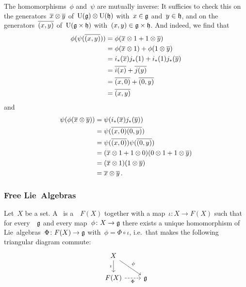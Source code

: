 \begin{example}
\begin{itemize}
      The homomorphisms~$\phi$ and~$\psi$ are mutually inverse:
      It sufficies to check this on the generators~$\overline{x} \otimes \overline{y}$ of~$\operatorname{U}(\mathfrak{g}) \otimes \operatorname{U}(\mathfrak{h})$ with~$x \in \mathfrak{g}$ and~$y \in \mathfrak{h}$, and on the generators~$\overline{(x,y)}$ of~$\operatorname{U}(\mathfrak{g} \times \mathfrak{h})$ with~$(x,y) \in \mathfrak{g} \times \mathfrak{h}$.
      And indeed, we find that
      \begin{align*}
        \phi( \psi( \overline{(x,y)} ) )
        &=
        \phi( \overline{x} \otimes 1 + 1 \otimes \overline{y} )
        \\
        &=
        \phi( \overline{x} \otimes 1 ) + \phi( 1 \otimes \overline{y} )
        \\
        &=
        i_*(\overline{x}) j_*(1) + i_*(1) j_*(\overline{y})
        \\
        &=
        \overline{i(x)} + \overline{j(y)}
        \\
        &=
        \overline{(x,0)} + \overline{(0,y)}
        \\
        &=
        \overline{(x,y)}
      \end{align*}
      and
      \begin{align*}
        \psi( \phi( \overline{x} \otimes \overline{y} ) )
        &=
        \psi( i_*(\overline{x}) j_*(\overline{y}) )
        \\
        &=
        \psi( \overline{(x,0)} \overline{(0,y)} )
        \\
        &=
        \psi( \overline{(x,0)} ) \psi( \overline{(0,y)} )
        \\
        &=
        ( \overline{x} \otimes 1 + 1 \otimes 0 ) ( 0 \otimes 1 + 1 \otimes \overline{y} )
        \\
        &=
        (\overline{x} \otimes 1) (1 \otimes \overline{y})
        \\
        &=
        \overline{x} \otimes \overline{y} \,.
      \end{align*}
  \end{itemize}
\end{example}



\subsubsection{Free Lie~Algebras}


\begin{definition}
  Let~$X$ be a set.
  A~ is a~{\liealgebra{$\kf$}}~$F(X)$ together with a map~$\iota \colon X \to F(X)$ such that for every~{\liealgebra{$\kf$}}~$\mathfrak{g}$ and every map~$\phi \colon X \to \mathfrak{g}$ there exists a unique homomorphism of Lie~algebras~$\Phi \colon F(X) \to \mathfrak{g}$ with~$\phi = \Phi \circ \iota$, i.e.\ that makes the following triangular diagram commute:
  \[
    \begin{tikzcd}
      X
      \arrow{dr}[above right]{\phi}
      \arrow{d}[left]{\iota}
      &
      {}
      \\
      F(X)
      \arrow[dashed]{r}[below]{\Phi}
      &
      \glie
    \end{tikzcd}
  \]
\end{definition}


